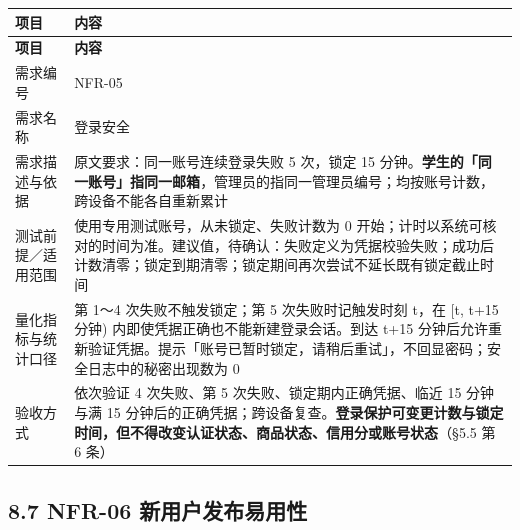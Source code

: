 \documentclass[12pt,a4paper]{ctexart}
\begin{document}
{\footnotesize
\begin{longtable}{|p{2.75cm}|p{13.25cm}|}
\hline
\textbf{项目} & \textbf{内容} \\
\hline
\endfirsthead
\hline
\textbf{项目} & \textbf{内容} \\
\hline
\endhead
\hline
\endfoot
需求编号 & NFR-05 \\
\hline
需求名称 & 登录安全 \\
\hline
需求描述与依据 & 原文要求：同一账号连续登录失败 5 次，锁定 15 分钟。\textbf{学生的「同一账号」指同一邮箱}，管理员的指同一管理员编号；均按账号计数，跨设备不能各自重新累计 \\
\hline
测试前提／适用范围 & 使用专用测试账号，从未锁定、失败计数为 0 开始；计时以系统可核对的时间为准。建议值，待确认：失败定义为凭据校验失败；成功后计数清零；锁定到期清零；锁定期间再次尝试不延长既有锁定截止时间 \\
\hline
量化指标与统计口径 & 第 1～4 次失败不触发锁定；第 5 次失败时记触发时刻 t，在 [t, t+15 分钟) 内即使凭据正确也不能新建登录会话。到达 t+15 分钟后允许重新验证凭据。提示「账号已暂时锁定，请稍后重试」，不回显密码；安全日志中的秘密出现数为 0 \\
\hline
验收方式 & 依次验证 4 次失败、第 5 次失败、锁定期内正确凭据、临近 15 分钟与满 15 分钟后的正确凭据；跨设备复查。\textbf{登录保护可变更计数与锁定时间，但不得改变认证状态、商品状态、信用分或账号状态}（§5.5 第 6 条） \\
\hline
\end{longtable}
}


\subsection*{8.7 NFR-06 新用户发布易用性}
\end{document}
